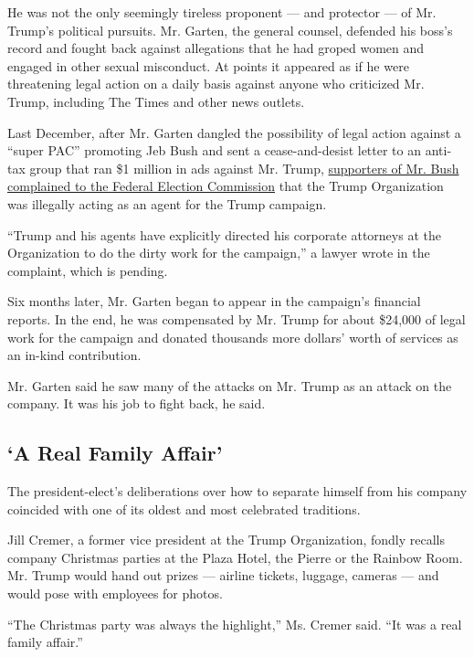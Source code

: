 He was not the only seemingly tireless proponent --- and protector ---
of Mr. Trump's political pursuits. Mr. Garten, the general counsel,
defended his boss's record and fought back against allegations that he
had groped women and engaged in other sexual misconduct. At points it
appeared as if he were threatening legal action on a daily basis against
anyone who criticized Mr. Trump, including The Times and other news
outlets.

Last December, after Mr. Garten dangled the possibility of legal action
against a ``super PAC'' promoting Jeb Bush and sent a cease-and-desist
letter to an anti-tax group that ran \$1 million in ads against Mr.
Trump,
\href{http://www.nytimes.com/politics/first-draft/2015/12/09/lawyer-for-pacs-backing-jeb-bush-asks-f-e-c-to-investigate-donald-trump/}{supporters
of Mr. Bush complained to the Federal Election Commission} that the
Trump Organization was illegally acting as an agent for the Trump
campaign.

``Trump and his agents have explicitly directed his corporate attorneys
at the Organization to do the dirty work for the campaign,'' a lawyer
wrote in the complaint, which is pending.

Six months later, Mr. Garten began to appear in the campaign's financial
reports. In the end, he was compensated by Mr. Trump for about \$24,000
of legal work for the campaign and donated thousands more dollars' worth
of services as an in-kind contribution.

Mr. Garten said he saw many of the attacks on Mr. Trump as an attack on
the company. It was his job to fight back, he said.

\hypertarget{a-real-family-affair}{%
\subsection{`A Real Family Affair'}\label{a-real-family-affair}}

The president-elect's deliberations over how to separate himself from
his company coincided with one of its oldest and most celebrated
traditions.

Jill Cremer, a former vice president at the Trump Organization, fondly
recalls company Christmas parties at the Plaza Hotel, the Pierre or the
Rainbow Room. Mr. Trump would hand out prizes --- airline tickets,
luggage, cameras --- and would pose with employees for photos.

``The Christmas party was always the highlight,'' Ms. Cremer said. ``It
was a real family affair.''

